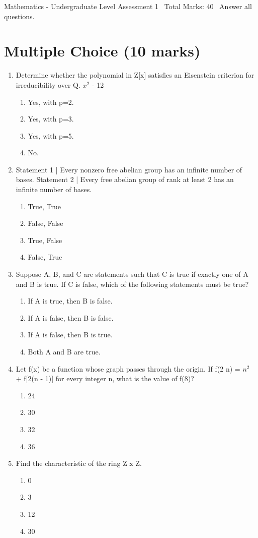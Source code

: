 \documentclass[12pt]{article}
\begin{document}
\begin{center}
Mathematics - Undergraduate Level Assessment 1 \
Total Marks: 40 \
Answer all questions.
\end{center}

\section*{Multiple Choice (10 marks)}
\begin{enumerate}[label=\arabic*.]
\item Determine whether the polynomial in Z[x] satisfies an Eisenstein criterion for irreducibility over Q. $x^2$ - 12
\begin{enumerate}[label=(\alph*)]
    \item Yes, with p=2.
    \item Yes, with p=3.
    \item Yes, with p=5.
    \item No.
\end{enumerate}
\item Statement 1 | Every nonzero free abelian group has an infinite number of bases. Statement 2 | Every free abelian group of rank at least 2 has an infinite number of bases.
\begin{enumerate}[label=(\alph*)]
    \item True, True
    \item False, False
    \item True, False
    \item False, True
\end{enumerate}
\item Suppose A, B, and C are statements such that C is true if exactly one of A and B is true. If C is false, which of the following statements must be true?
\begin{enumerate}[label=(\alph*)]
    \item If A is true, then B is false.
    \item If A is false, then B is false.
    \item If A is false, then B is true.
    \item Both A and B are true.
\end{enumerate}
\item Let f(x) be a function whose graph passes through the origin. If f(2 n) = $n^2$ + f[2(n - 1)] for every integer n, what is the value of f(8)?
\begin{enumerate}[label=(\alph*)]
    \item 24
    \item 30
    \item 32
    \item 36
\end{enumerate}
\item Find the characteristic of the ring Z x Z.
\begin{enumerate}[label=(\alph*)]
    \item 0
    \item 3
    \item 12
    \item 30
\end{enumerate}
\end{enumerate}
\end{document}
